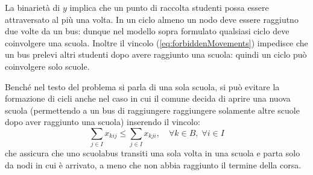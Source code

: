 La binarietà di $y$ implica che un punto di raccolta studenti possa essere attraversato al più una volta. In un ciclo almeno un nodo deve essere raggiutno due volte da un bus: dunque nel modello sopra formulato qualsiasi ciclo deve coinvolgere una scuola. Inoltre il vincolo (\ref{eq:forbiddenMovements}) impedisce che un bus prelevi altri studenti dopo avere raggiunto una scuola: quindi un ciclo può coinvolgere solo scuole.

Benché nel testo del problema si parla di una sola scuola, si può evitare la formazione di cicli anche nel caso in cui il comune decida di aprire una nuova scuola (permettendo a un bus di raggiungere raggiungere solamente altre scuole dopo aver raggiunto una scuola) inserendo il vincolo:
\begin{equation}
  \sum_{j \in I} x_{kij} \leq \sum_{j \in I} x_{kji},\quad \forall k \in B,\;\forall i \in I
\end{equation}
che assicura che uno scuolabus transiti una sola volta in una scuola e parta solo da nodi in cui è arrivato, a meno che non abbia raggiunto il termine della corsa.

